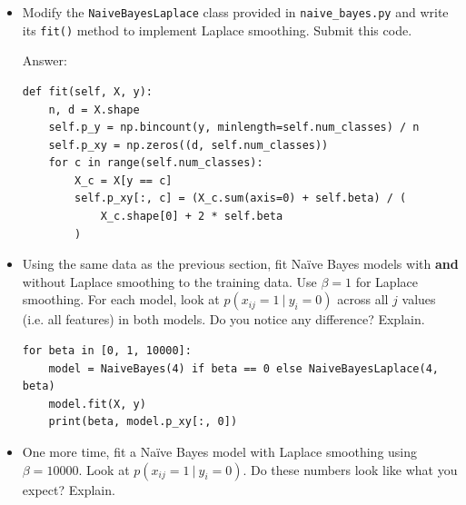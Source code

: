 \documentclass{article}
\newcommand{\blu}[1]{{\textcolor{blu}{#1}}}
\let\ask\blu
\begin{document}
    \begin{itemize}
        \item Modify the \texttt{NaiveBayesLaplace} class provided in \texttt{naive\_bayes.py} and write its \texttt{fit()} method to implement Laplace smoothing. \ask{Submit this code.}
        \par\noindent\textcolor{gre}{Answer:}
\begin{lstlisting}
def fit(self, X, y):
    n, d = X.shape
    self.p_y = np.bincount(y, minlength=self.num_classes) / n
    self.p_xy = np.zeros((d, self.num_classes))
    for c in range(self.num_classes):
        X_c = X[y == c]
        self.p_xy[:, c] = (X_c.sum(axis=0) + self.beta) / (
            X_c.shape[0] + 2 * self.beta
        )
\end{lstlisting}


        \item Using the same data as the previous section, fit Na\"ive Bayes models with \textbf{and} without Laplace smoothing to the training data. Use $\beta=1$ for Laplace smoothing. For each model, look at $p(x_{ij} = 1 \ | \ y_i = 0)$ across all $j$ values (i.e. all features) in both models. \ask{Do you notice any difference? Explain.}


\begin{lstlisting}
for beta in [0, 1, 10000]:
    model = NaiveBayes(4) if beta == 0 else NaiveBayesLaplace(4, beta)
    model.fit(X, y)
    print(beta, model.p_xy[:, 0])
\end{lstlisting}
        \item One more time, fit a Na\"ive Bayes model with Laplace smoothing using $\beta=10000$. Look at $p(x_{ij} = 1 \ | \ y_i = 0)$. \ask{Do these numbers look like what you expect? Explain.}
    \end{itemize}
\end{document}
